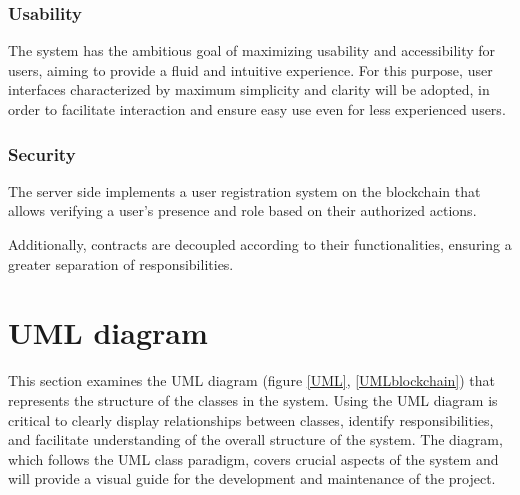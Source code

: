 \subsubsection{Usability}
The system has the ambitious goal of maximizing usability and accessibility for users, aiming to provide a fluid and intuitive experience. For this purpose, user interfaces characterized by maximum simplicity and clarity will be adopted, in order to facilitate interaction and ensure easy use even for less experienced users.

\subsubsection{Security}
The server side implements a user registration system on the blockchain that allows verifying a user's presence and role based on their authorized actions.

Additionally, contracts are decoupled according to their functionalities, ensuring a greater separation of responsibilities.


\section{UML diagram}
This section examines the UML diagram (figure \ref{UML}, \ref{UMLblockchain}) that represents the structure of the classes in the system. Using the UML diagram is critical to clearly display relationships between classes, identify responsibilities, and facilitate understanding of the overall structure of the system. The diagram, which follows the UML class paradigm, covers crucial aspects of the system and will provide a visual guide for the development and maintenance of the project.

